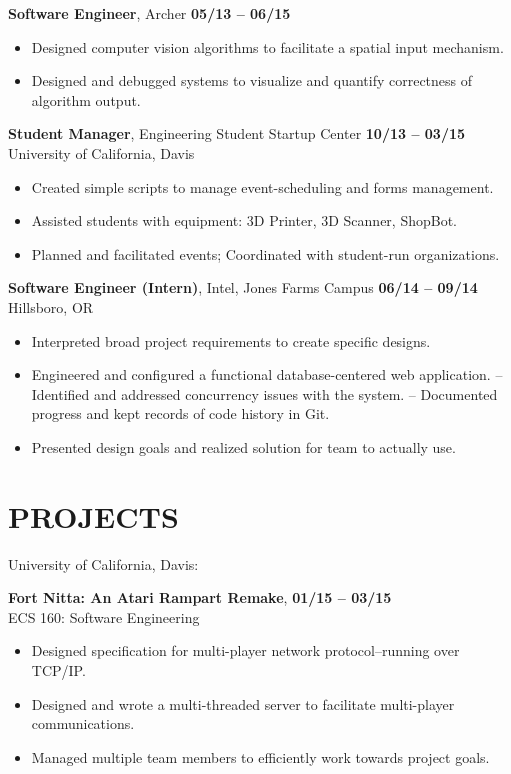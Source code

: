 \documentclass[line, letterpaper, 10pt]{res}
\begin{document}
\begin{resume}
    {\bf Software Engineer}, Archer \hfill {\bf 05/13 -- 06/15}
    \begin{itemize} \itemsep -2pt %
        \item Designed computer vision algorithms to facilitate a spatial input mechanism.
        \item Designed and debugged systems to visualize and quantify correctness of algorithm output.
    \end{itemize}

    {\bf Student Manager}, Engineering Student Startup Center \hfill {\bf 10/13 -- 03/15} \\
    University of California, Davis
    \begin{itemize} \itemsep -2pt %
        \item Created simple scripts to manage event-scheduling and forms management.
        \item Assisted students with equipment: 3D Printer, 3D Scanner, ShopBot.
        \item Planned and facilitated events; Coordinated with student-run organizations.
    \end{itemize}

    {\bf Software Engineer (Intern)}, Intel, Jones Farms Campus \hfill {\bf 06/14 -- 09/14} \\
    Hillsboro, OR
    \begin{itemize} \itemsep -2pt
        \item Interpreted broad project requirements to create specific designs.
        \item Engineered and configured a functional database-centered web application.
            \subitem -- Identified and addressed concurrency issues with the system.
            \subitem -- Documented progress and kept records of code history in Git.
        \item Presented design goals and realized solution for team to actually use.
    \end{itemize}

\section{PROJECTS}

    University of California, Davis:

    {\bf Fort Nitta: An Atari Rampart Remake}, \hfill {\bf 01/15 -- 03/15} \\
    ECS 160: Software Engineering
    \begin{itemize} \itemsep -2pt
        \item Designed specification for multi-player network protocol--running over TCP/IP.
        \item Designed and wrote a multi-threaded server to facilitate multi-player communications.
        \item Managed multiple team members to efficiently work towards project goals.
    \end{itemize}


\end{resume}
\end{document}
